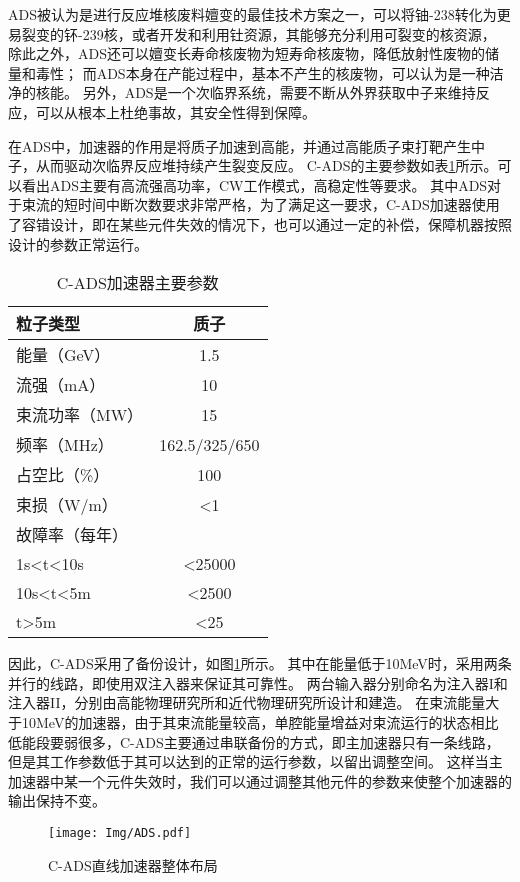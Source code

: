 ADS被认为是进行反应堆核废料嬗变的最佳技术方案之一，可以将铀-238转化为更易裂变的钚-239核，或者开发和利用钍资源，其能够充分利用可裂变的核资源，
除此之外，ADS还可以嬗变长寿命核废物为短寿命核废物，降低放射性废物的储量和毒性；
而ADS本身在产能过程中，基本不产生的核废物，可以认为是一种洁净的核能。
另外，ADS是一个次临界系统，需要不断从外界获取中子来维持反应，可以从根本上杜绝事故，其安全性得到保障。

在ADS中，加速器的作用是将质子加速到高能，并通过高能质子束打靶产生中子，从而驱动次临界反应堆持续产生裂变反应。
C-ADS的主要参数如表\ref{tab:C_ADS_parameter}所示\cite{zhihuili2011ADS}。可以看出ADS主要有高流强高功率，CW工作模式，高稳定性等要求。
其中ADS对于束流的短时间中断次数要求非常严格，为了满足这一要求，C-ADS加速器使用了容错设计，即在某些元件失效的情况下，也可以通过一定的补偿，保障机器按照设计的参数正常运行。

\begin{table}[!htb]
  \centering
  \begin{tabular}{>{\small}l|c}
    \hline
    粒子类型              &质子  \\
    \hline
    能量（GeV）           &1.5   \\
    \hline
    流强（mA）            &10    \\
    \hline
    束流功率（MW）        &15    \\
    \hline
    频率（MHz）           &162.5/325/650  \\
    \hline
    占空比（\%）          &100   \\
    \hline
    束损（W/m）           &<1    \\
    \hline
    故障率（每年）        & \\
    \qquad 1s<t<10s        & <25000 \\
    \qquad 10s<t<5m        & <2500  \\
    \qquad t>5m            & <25    \\
    \hline
  \end{tabular}
  \caption{C-ADS加速器主要参数}
  \label{tab:C_ADS_parameter}
\end{table}

因此，C-ADS采用了备份设计，如图\ref{fig:ADS_two_injector}所示\cite{fang2014physics}。
其中在能量低于10MeV时，采用两条并行的线路，即使用双注入器来保证其可靠性。
两台输入器分别命名为注入器I和注入器II，分别由高能物理研究所和近代物理研究所设计和建造。
在束流能量大于10MeV的加速器，由于其束流能量较高，单腔能量增益对束流运行的状态相比低能段要弱很多，C-ADS主要通过串联备份的方式，即主加速器只有一条线路，但是其工作参数低于其可以达到的正常的运行参数，以留出调整空间。
这样当主加速器中某一个元件失效时，我们可以通过调整其他元件的参数来使整个加速器的输出保持不变。


\begin{figure}[!htb]
    \centering
    \texttt{[image: Img/ADS.pdf]}
    \caption{C-ADS直线加速器整体布局}
    \label{fig:ADS_two_injector}
\end{figure}


